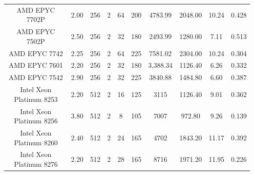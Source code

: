 \begin{table}[H]
{\begin{tabular}{c||c|c|c|c|c|c|c|c|c}
\rowcolor[HTML]{EFEFEF} 
AMD EPYC 7702P            & 2.00       & 256                                                       & 2                                                        & 64    & 200   & 4783.99    & 2048.00       & 10.24       & 0.428         \\
AMD EPYC 7502P            & 2.50       & 256                                                       & 2                                                        & 32    & 180   & 2493.99    & 1280.00       & 7.11        & 0.513         \\
\rowcolor[HTML]{EFEFEF} 
AMD EPYC 7742             & 2.25       & 256                                                       & 2                                                        & 64    & 225   & 7581.02    & 2304.00       & 10.24       & 0.304         \\
AMD EPYC 7601             & 2.20       & 256                                                       & 2                                                        & 32    & 180   & 3,388.34   & 1126.40       & 6.26        & 0.332         \\
\rowcolor[HTML]{EFEFEF} 
AMD EPYC 7542             & 2.90       & 256                                                       & 2                                                        & 32    & 225   & 3840.88    & 1484.80       & 6.60        & 0.387         \\ \hline
Intel Xeon Platinum 8253  & 2.20       & 512                                                       & 2                                                        & 16    & 125   & 3115       & 1126.40       & 9.01        & 0.362         \\
\rowcolor[HTML]{EFEFEF} 
Intel Xeon Platinum 8256  & 3.80       & 512                                                       & 2                                                        & 8     & 105   & 7007       & 972.80        & 9.26        & 0.139         \\
Intel Xeon Platinum 8260  & 2.40       & 512                                                       & 2                                                        & 24    & 165   & 4702       & 1843.20       & 11.17       & 0.392         \\
\rowcolor[HTML]{EFEFEF} 
Intel Xeon Platinum 8276  & 2.20       & 512                                                       & 2                                                        & 28    & 165   & 8716       & 1971.20       & 11.95       & 0.226         \\

\end{tabular}}
\end{table}
